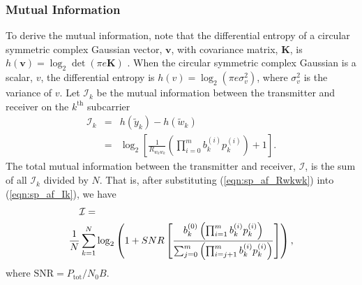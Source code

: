 \documentclass[journal]{IEEEtran}
\begin{document}
\subsubsection{Mutual Information}
To derive the mutual information, note that the differential
entropy of a circular symmetric complex Gaussian vector,
$\mathbf{v}$, with covariance matrix, $\mathbf{K}$, is
$h\left(\mathbf{v}\right) = \log_2 \det \left( \pi e \mathbf{K}
\right)$ \cite{article:Telatar01}.  When the circular symmetric
complex Gaussian is a scalar, $v$, the differential entropy is
$h\left(v\right) = \log_2 \left( \pi e \sigma_v^2 \right)$, where
$\sigma_v^2$ is the variance of $v$.  Let $\mathcal{I}_k$ be the
mutual information between the transmitter and receiver on the
$k^{\mbox{th}}$ subcarrier
\begin{eqnarray}
\mathcal{I}_k & = & h\left( \tilde{y}_k \right) - h \left( \tilde{w}_k \right) \nonumber \\
& = & \log_2 \left[ \frac{1}{R_{w_kw_k}} \left( \prod_{i=0}^m
b_k^{(i)} p_k^{(i)} \right) + 1 \right]. \label{eqn:sp_af_Ik}
\end{eqnarray}
The total mutual information between the transmitter and receiver,
$\mathcal{I}$, is the sum of all $\mathcal{I}_k$ divided by $N$.
That is, after substituting (\ref{eqn:sp_af_Rwkwk}) into
(\ref{eqn:sp_af_Ik}), we have
\begin{eqnarray}
\mathcal{I} = \hspace{2.8in} \nonumber \\
\frac{1}{N} \sum_{k=1}^N \log_2 \left( 1 + \mbox{SNR} \left[
\frac{b_k^{(0)}\left( \prod_{i=1}^m b_k^{(i)} p_k^{(i)} \right)}
{\sum_{j=0}^m \left( \prod_{i=j+1}^m b_k^{(i)} p_k^{(i)} \right)
}\right]
 \right),
\label{eqn:sp_af_I}
\end{eqnarray}
where $\mbox{SNR} = P_{\mbox{tot}} / N_0 B$.
\end{document}
